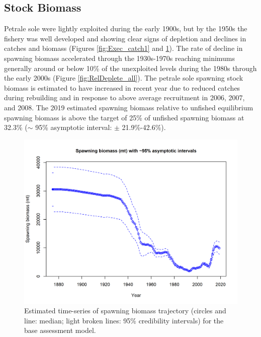 \documentclass[12pt,]{article}
\begin{document}
\subsection*{Stock Biomass}\label{stock-biomass}

Petrale sole were lightly exploited during the early 1900s, but by the
1950s the fishery was well developed and showing clear signs of
depletion and declines in catches and biomass (Figures
\ref{fig:Exec_catch1} and \ref{fig:Spawnbio_all}). The rate of decline
in spawning biomass accelerated through the 1930s-1970s reaching
minimums generally around or below 10\% of the unexploited levels during
the 1980s through the early 2000s (Figure \ref{fig:RelDeplete_all}). The
petrale sole spawning stock biomass is estimated to have increased in
recent year due to reduced catches during rebuilding and in response to
above average recruitment in 2006, 2007, and 2008. The 2019 estimated
spawning biomass relative to unfished equilibrium spawning biomass is
above the target of 25\% of unfished spawning biomass at 32.3\%
(\(\sim\) 95\% asymptotic interval: \(\pm\) 21.9\%-42.6\%).

\begin{figure}
\centering
\includegraphics{r4ss/plots_mod1/ts7_Spawning_biomass_(mt)_with_95_asymptotic_intervals_intervals.png}
\caption{Estimated time-series of spawning biomass trajectory (circles
and line: median; light broken lines: 95\% credibility intervals) for
the base assessment model. \label{fig:Spawnbio_all}}
\end{figure}
\end{document}
